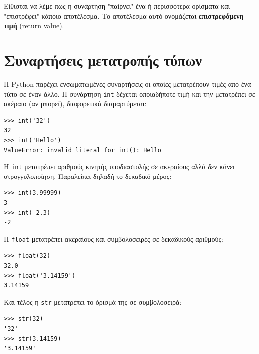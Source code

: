 \documentclass[10pt]{book}
\begin{document}

Είθισται να λέμε πως η συνάρτηση "παίρνει" ένα ή περισσότερα ορίσματα και "επιστρέφει" κάποιο αποτέλεσμα. Το αποτέλεσμα αυτό ονομάζεται {\bf
επιστρεφόμενη τιμή} (return value).



\section{Συναρτήσεις μετατροπής τύπων}



Η Python παρέχει ενσωματωμένες συναρτήσεις οι οποίες
μετατρέπουν τιμές από ένα τύπο σε έναν άλλο. Η συνάρτηση {\tt int} δέχεται 
οποιαδήποτε τιμή και την μετατρέπει σε ακέραιο (αν μπορεί), διαφορετικά  διαμαρτύρεται:


\begin{verbatim}
>>> int('32')
32
>>> int('Hello')
ValueError: invalid literal for int(): Hello
\end{verbatim}
%

H {\tt int} μετατρέπει αριθμούς κινητής υποδιαστολής σε ακεραίους αλλά δεν κάνει στρογγυλοποίηση. Παραλείπει δηλαδή το δεκαδικό μέρος:


\begin{verbatim}
>>> int(3.99999)
3
>>> int(-2.3)
-2
\end{verbatim}
%

Η {\tt float} μετατρέπει ακεραίους και συμβολοσειρές σε δεκαδικούς
αριθμούς:

\begin{verbatim}
>>> float(32)
32.0
>>> float('3.14159')
3.14159
\end{verbatim}
%

Και τέλος η {\tt str} μετατρέπει το όρισμά της σε συμβολοσειρά:

\begin{verbatim}
>>> str(32)
'32'
>>> str(3.14159)
'3.14159'
\end{verbatim}
%
\end{document}
